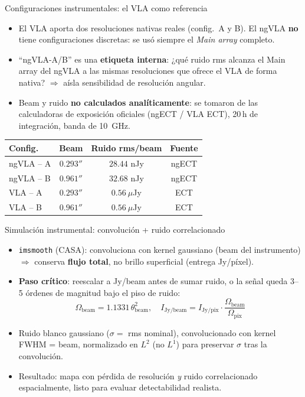 \documentclass[12pt,aspectratio=169]{beamer}
\begin{document}
\begin{frame}{Configuraciones instrumentales: el VLA como referencia}
    \begin{itemize}
        \item El VLA aporta dos resoluciones nativas reales (config.\ A y
        B). El ngVLA \textbf{no} tiene configuraciones discretas: se usó
        siempre el \emph{Main array} completo.
        \item ``ngVLA-A/B'' es una \textbf{etiqueta interna}: ¿qué ruido
        rms alcanza el Main array del ngVLA a las mismas resoluciones que
        ofrece el VLA de forma nativa? $\Rightarrow$ aísla sensibilidad de
        resolución angular.
        \item Beam y ruido \textbf{no calculados analíticamente}: se
        tomaron de las calculadoras de exposición oficiales (ngECT / VLA
        ECT), 20\,h de integración, banda de 10~GHz.
    \end{itemize}
    \begin{center}
    \small
    \begin{tabular}{lccc}
    \toprule
    Config. & Beam & Ruido rms/beam & Fuente \\
    \midrule
    ngVLA -- A & $0.293''$ & $28.44$ nJy & ngECT \\
    ngVLA -- B & $0.961''$ & $32.68$ nJy & ngECT \\
    VLA -- A   & $0.293''$ & $0.56\ \mu$Jy & ECT \\
    VLA -- B   & $0.961''$ & $0.56\ \mu$Jy & ECT \\
    \bottomrule
    \end{tabular}
    \end{center}
\end{frame}

\begin{frame}{Simulación instrumental: convolución + ruido correlacionado}
    \begin{itemize}
        \item \texttt{imsmooth} (CASA): convoluciona con kernel gaussiano
        (beam del instrumento) $\Rightarrow$ conserva \textbf{flujo total},
        no brillo superficial (entrega Jy/píxel).
        \item \textbf{Paso crítico}: reescalar a Jy/beam antes de sumar
        ruido, o la señal queda 3--5 órdenes de magnitud bajo el piso de
        ruido:
        \begin{equation*}
            \Omega_{\mathrm{beam}} = 1.1331\,\theta_{\mathrm{beam}}^2,\quad
            I_{\mathrm{Jy/beam}} = I_{\mathrm{Jy/pix}}\cdot
            \frac{\Omega_{\mathrm{beam}}}{\Omega_{\mathrm{pix}}}
        \end{equation*}
        \item Ruido blanco gaussiano ($\sigma=$ rms nominal), convolucionado
        con kernel FWHM = beam, normalizado en $L^2$ (no $L^1$) para
        preservar $\sigma$ tras la convolución.
        \item Resultado: mapa con pérdida de resolución \emph{y} ruido
        correlacionado espacialmente, listo para evaluar detectabilidad
        realista.
    \end{itemize}
\end{frame}
\end{document}
